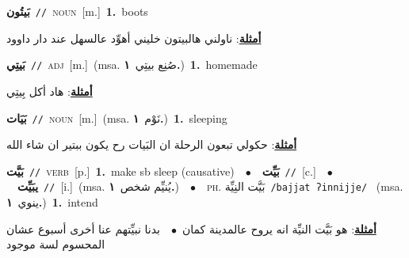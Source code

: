 \documentclass[10pt,a4paper,twoside]{article} %
\begin{document}
\begin{multicols}{2}
{\setlength\topsep{0pt}\textbf{\foreignlanguage{arabic}{بَيتُون}}\ {\color{gray}\texttt{//}\color{black}}\ \textsc{noun}\ [m.]\ \textbf{1.}~boots\  \begin{flushright}\color{gray}\foreignlanguage{arabic}{\textbf{\underline{\foreignlanguage{arabic}{أمثلة}}}: ناولني هالبيتون خليني أهوِّد عالسهل عند دار داوود}\end{flushright}\color{black}} \vspace{2mm}

{\setlength\topsep{0pt}\textbf{\foreignlanguage{arabic}{بَيتِي}}\ {\color{gray}\texttt{//}\color{black}}\ \textsc{adj}\ [m.]\ \color{gray}(msa. \foreignlanguage{arabic}{صُنِع بيتِي}~\foreignlanguage{arabic}{\textbf{١.}})\color{black}\ \textbf{1.}~homemade\  \begin{flushright}\color{gray}\foreignlanguage{arabic}{\textbf{\underline{\foreignlanguage{arabic}{أمثلة}}}: هاد أكل بِيتِي}\end{flushright}\color{black}} \vspace{2mm}

{\setlength\topsep{0pt}\textbf{\foreignlanguage{arabic}{بَيَات}}\ {\color{gray}\texttt{//}\color{black}}\ \textsc{noun}\ [m.]\ \color{gray}(msa. \foreignlanguage{arabic}{نَوْم}~\foreignlanguage{arabic}{\textbf{١.}})\color{black}\ \textbf{1.}~sleeping\  \begin{flushright}\color{gray}\foreignlanguage{arabic}{\textbf{\underline{\foreignlanguage{arabic}{أمثلة}}}: حكولي تبعون الرحلة ان البَيات رح يكون ببتير ان شاء الله}\end{flushright}\color{black}} \vspace{2mm}

{\setlength\topsep{0pt}\textbf{\foreignlanguage{arabic}{بَيَّت}}\ {\color{gray}\texttt{//}\color{black}}\ \textsc{verb}\ [p.]\ \textbf{1.}~make sb sleep (causative)\ \ $\bullet$\ \ \setlength\topsep{0pt}\textbf{\foreignlanguage{arabic}{بَيِّت}}\ {\color{gray}\texttt{//}\color{black}}\ [c.]\ \ $\bullet$\ \ \setlength\topsep{0pt}\textbf{\foreignlanguage{arabic}{يبَيِّت}}\ {\color{gray}\texttt{//}\color{black}}\ [i.]\ \color{gray}(msa. \foreignlanguage{arabic}{يُنيِّم شخص}~\foreignlanguage{arabic}{\textbf{١.}})\color{black}\ \ $\bullet$\ \ \textsc{ph.} \color{gray} \foreignlanguage{arabic}{بَيَّت النِيِّة}\color{black}\ {\color{gray}\texttt{/{\sffamily bajjat ʔinnijje}/}\color{black}}\ \color{gray} (msa. \foreignlanguage{arabic}{ينوي}~\foreignlanguage{arabic}{\textbf{١.}})\color{black}\ \textbf{1.}~intend\  \begin{flushright}\color{gray}\foreignlanguage{arabic}{\textbf{\underline{\foreignlanguage{arabic}{أمثلة}}}: هو بَيَّت النيِّة انه يروح عالمدينة كمان\ $\bullet$\ \  بدنا نبيِّتهم عنا أخرى أسبوع عشان المحسوم لسة موجود}\end{flushright}\color{black}} \vspace{2mm}


\end{multicols}
\end{document}
